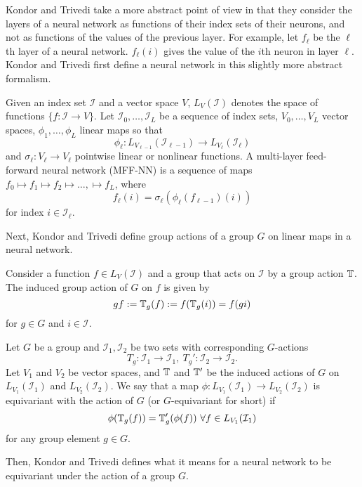 Kondor and Trivedi take a more abstract point of view in that they consider the layers of a neural network as functions of their index sets of their neurons, and not as functions of the values of the previous layer.
For example, let $f_{\ell}$ be the $\ell$th layer of a neural network.
$f_{\ell}(i)$ gives the value of the $i$th neuron in layer $\ell$.
Kondor and Trivedi first define a neural network in this slightly more abstract formalism.
\begin{definition} \label{def:nn}
Given an index set $\mathcal{I}$ and a vector space $V$, $L_V(\mathcal{I})$ denotes the space of functions $\{f : \mathcal{I} \to V\}$.
	Let $\mathcal{I}_0, \ldots, \mathcal{I}_L$ be a sequence of index sets, $V_0, \ldots, V_L$ vector spaces, $\phi_1, \ldots, \phi_L$ linear maps so that
	$$
		\phi_\ell: L_{V_{\ell-1}}(\mathcal{I}_{\ell - 1}) \to L_{V_{\ell}}(\mathcal{I}_{\ell})
	$$
	and $\sigma_{\ell}: V_{\ell} \to V_{\ell}$ pointwise linear or nonlinear functions.
	A multi-layer feed-forward neural network (MFF-NN) is a sequence of maps $f_0 \mapsto f_1 \mapsto f_2 \mapsto \ldots, \mapsto f_L$, where
	$$
		f_{\ell}(i) = \sigma_{\ell}( \phi_{\ell}(f_{\ell-1})(i))
	$$
	for index $i \in \mathcal{I}_{\ell}$.
\end{definition}

Next, Kondor and Trivedi define group actions of a group $G$ on linear maps in a neural network.
\begin{definition}
	Consider a function $f \in L_{V}(\mathcal{I})$ and a group that acts on $\mathcal{I}$ by a group action $\mathbb{T}$.
	The induced group action of $G$ on $f$ is given by
	$$
		gf := \mathbb{T}_g(f) := f(\mathbb{T}_g(i)) = f(gi)
	$$
	for $g \in G$ and $i \in \mathcal{I}$.
\end{definition}
\begin{definition} \label{def:equi_nn}
	Let $G$ be a group and $\mathcal{I}_1, \mathcal{I}_2$ be two sets with corresponding $G$-actions
	$$
		T_g: \mathcal{I}_1 \to \mathcal{I}_1,\ T_g' : \mathcal{I}_2 \to \mathcal{I}_2.
	$$
	Let $V_1$ and $V_2$ be vector spaces, and $\mathbb{T}$ and $\mathbb{T}'$ be the induced actions of $G$ on $L_{V_1}(\mathcal{I}_1)$ and $L_{V_2}(\mathcal{I}_2)$.
	We say that a map $\phi: L_{V_1}(\mathcal{I}_1) \to L_{V_2}(\mathcal{I}_2)$ is equivariant with the action of $G$ (or $G$-equivariant for short) if
	$$
		\phi(\mathbb{T}_g(f)) = \mathbb{T}'_g(\phi(f))\ \forall f \in L_{V_1}(\mathcal{I}_1)
	$$
	for any group element $g \in G$.
\end{definition}

Then, Kondor and Trivedi defines what it means for a neural network to be equivariant under the action of a group $G$.

